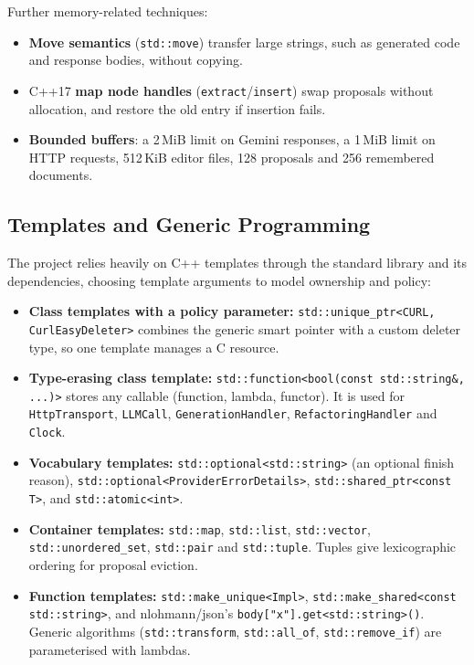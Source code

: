 \documentclass[12pt,a4paper,oneside]{book}
\begin{document}
Further memory-related techniques:
\begin{itemize}
  \item \textbf{Move semantics} (\texttt{std::\allowbreak{}move}) transfer large strings,
    such as generated code and response bodies, without copying.
  \item C++17 \textbf{map node handles} (\texttt{extract}/\texttt{insert})
    swap proposals without allocation, and restore the old entry if
    insertion fails.
  \item \textbf{Bounded buffers}: a 2\,MiB limit on Gemini responses, a
    1\,MiB limit on HTTP requests, 512\,KiB editor files, 128 proposals and
    256 remembered documents.
\end{itemize}

\subsection{Templates and Generic Programming}

The project relies heavily on C++ templates through the standard library and
its dependencies, choosing template arguments to model ownership and policy:
\begin{itemize}
  \item \textbf{Class templates with a policy parameter:}
    \texttt{std::\allowbreak{}unique\_ptr<CURL, CurlEasyDeleter>} combines the generic
    smart pointer with a custom deleter type, so one template manages a C
    resource.
  \item \textbf{Type-erasing class template:}
    \texttt{std::\allowbreak{}function<bool(const std::\allowbreak{}string\&, ...)>} stores any callable
    (function, lambda, functor). It is used for \texttt{HttpTransport},
    \texttt{LLMCall}, \texttt{GenerationHandler}, \texttt{RefactoringHandler}
    and \texttt{Clock}.
  \item \textbf{Vocabulary templates:}
    \texttt{std::\allowbreak{}optional<std::\allowbreak{}string>} (an optional finish reason),
    \texttt{std::\allowbreak{}optional<ProviderErrorDetails>},
    \texttt{std::\allowbreak{}shared\_ptr<const T>}, and \texttt{std::\allowbreak{}atomic<int>}.
  \item \textbf{Container templates:} \texttt{std::\allowbreak{}map}, \texttt{std::\allowbreak{}list},
    \texttt{std::\allowbreak{}vector}, \texttt{std::\allowbreak{}unordered\_set}, \texttt{std::\allowbreak{}pair}
    and \texttt{std::\allowbreak{}tuple}. Tuples give lexicographic ordering for proposal
    eviction.
  \item \textbf{Function templates:} \texttt{std::\allowbreak{}make\_unique<Impl>},
    \texttt{std::\allowbreak{}make\_shared<const std::\allowbreak{}string>}, and nlohmann/json's
    \texttt{body["x"].get<std::\allowbreak{}string>()}. Generic algorithms
    (\texttt{std::\allowbreak{}transform}, \texttt{std::\allowbreak{}all\_of}, \texttt{std::\allowbreak{}remove\_if})
    are parameterised with lambdas.
\end{itemize}
\end{document}
